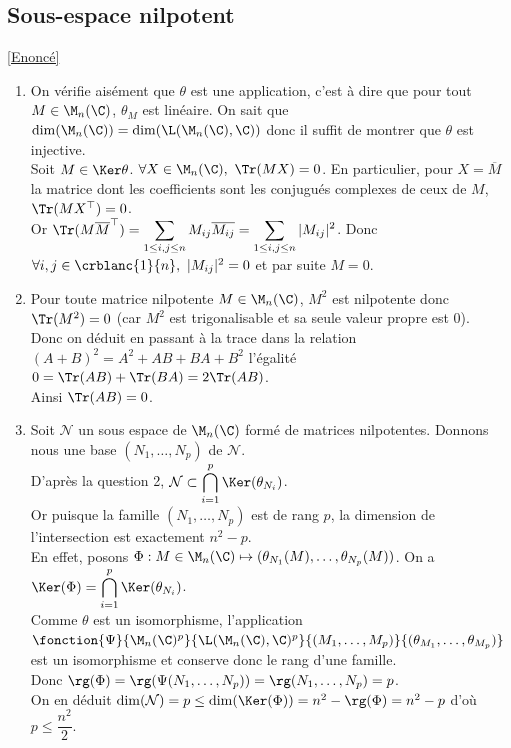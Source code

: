 \documentclass[8pt]{book}
\begin{document}
	\subsection{Sous-espace nilpotent }
	\label{Sous-espace nilpotent corrigé}
	\textcolor{blue}{\hyperref[Sous-espace nilpotent]{[Enoncé]}}\\
	\begin{enumerate}[leftmargin=*]
		\item On vérifie aisément que $\theta$ est une application, c'est à dire que pour tout $M\in \M_n(\C)$, $\theta_M$ est linéaire. On sait que $\dim(\M_n(\C))=\dim(\L(\M_n(\C),\C))$ donc il suffit de montrer que $\theta$ est injective.\\
		Soit $M\in \Ker\theta$. $\forall X\in \M_n(\C),\ \Tr(MX)=0$. En particulier, pour $X=\overline M$ la matrice dont les coefficients sont les conjugués complexes de ceux de $M$, $\Tr(MX^\top)=0$.\\
		Or $\Tr(M\overline{M}^\top)=\displaystyle\sum_{1\leq i,j\leq n}M_{ij}\overline{M_{ij}}=\sum_{1\leq i,j\leq n}|M_{ij}|^2$. Donc $\forall i,j\in \crblanc{1}{n},\ |M_{ij}|^2=0$ et par suite $M=0$.
		\item Pour toute matrice nilpotente $M\in \M_n(\C)$, $M^2$ est nilpotente donc $\Tr(M^2)=0$ (car $M^2$ est trigonalisable et sa seule valeur propre est $0$).\\
		Donc on déduit en passant à la trace dans la relation $(A+B)^2=A^2+AB+BA+B^2$ l'égalité $0=\Tr(AB)+\Tr(BA)=2\Tr(AB)$.\\
		Ainsi $\Tr(AB)=0$.
		\item Soit $\mathcal N$ un sous espace de $\M_n(\C)$ formé de matrices nilpotentes. Donnons nous une base $(N_1,\dots,N_p)$ de $\mathcal N$.\\
		D'après la question 2, $\mathcal N\subset\displaystyle\bigcap_{i=1}^p\Ker(\theta_{N_i})$.\\
		Or puisque la famille $(N_1,\dots,N_p)$ est de rang $p$, la dimension de l'intersection est exactement $n^2-p$.\\
		En effet, posons $\Phi:M\in \M_n(\C)\mapsto (\theta_{N_1}(M),\dots,\theta_{N_p}(M))$. On a $\Ker(\Phi)=\displaystyle\bigcap_{i=1}^p\Ker(\theta_{N_i})$.\\
		Comme $\theta$ est un isomorphisme, l'application $\fonction{\Psi}{\M_n(\C)^p}{\L(\M_n(\C),\C)^p}{(M_1,\dots,M_p)}{(\theta_{M_1},\dots,\theta_{M_p})}$ est un isomorphisme et conserve donc le rang d'une famille.\\
		Donc $\rg(\Phi)=\rg(\Psi(N_1,\dots,N_p))=\rg(N_1,\dots,N_p)=p$.\\
		On en déduit $\dim(\mathcal N)=p\leq \dim(\Ker(\Phi))=n^2-\rg(\Phi)=n^2-p$ d'où $p\leq \dfrac{n^2}{2}$.
	\end{enumerate}
	
\end{document}
